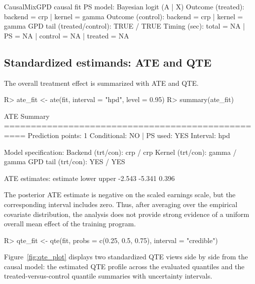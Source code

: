 \documentclass[article]{jss}\usepackage[]{graphicx}\usepackage[]{xcolor}
\renewenvironment{Schunk}{\vspace{0pt}}{\vspace{-0.1\baselineskip}}
\begin{document}
\begin{Schunk}
\begin{Soutput}
CausalMixGPD causal fit
PS model: Bayesian logit (A | X) 
Outcome (treated): backend = crp | kernel = gamma 
Outcome (control): backend = crp | kernel = gamma 
GPD tail (treated/control): TRUE / TRUE 
Timing (sec): total =   NA | PS =   NA | control =   NA | treated =   NA  
\end{Soutput}
\end{Schunk}

\subsection{Standardized estimands: ATE and QTE}

The overall treatment effect is summarized with ATE and QTE.

\begin{Schunk}
\begin{Sinput}
R> ate_fit <- ate(fit, interval = "hpd", level = 0.95)
R> summary(ate_fit)
\end{Sinput}
\begin{Soutput}
ATE Summary
================================================== 
Prediction points: 1
Conditional: NO | PS used: YES
Interval: hpd

Model specification:
  Backend (trt/con): crp / crp
  Kernel (trt/con): gamma / gamma
  GPD tail (trt/con): YES / YES

ATE estimates:
 estimate  lower upper
   -2.543 -5.341 0.396
\end{Soutput}
\end{Schunk}

The posterior ATE estimate is negative on the scaled earnings scale,
but the corresponding interval includes zero. Thus, after averaging
over the empirical covariate distribution, the analysis does not
provide strong evidence of a uniform overall mean effect of the
training program.

\begin{Schunk}
\begin{Sinput}
R> qte_fit <- qte(fit, probs = c(0.25, 0.5, 0.75), interval = "credible")
\end{Sinput}
\end{Schunk}

Figure~\ref{fig:qte_plot} displays two standardized QTE views side by
side from the causal model: the estimated QTE profile across the
evaluated quantiles and the treated-versus-control quantile summaries
with uncertainty intervals.
\end{document}
